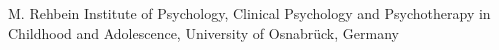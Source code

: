 
                {M. Rehbein}
                {Institute of Psychology, Clinical Psychology and Psychotherapy in Childhood and Adolescence, University of Osnabrück, Germany}
                